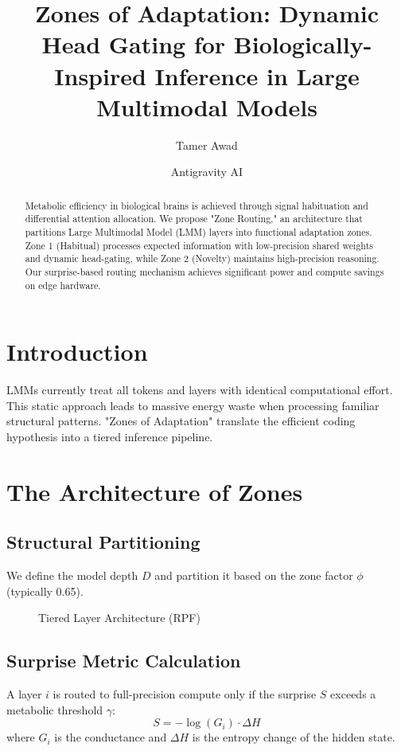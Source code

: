 \documentclass[10pt,twocolumn,letterpaper]{article}
\title{Zones of Adaptation: Dynamic Head Gating for Biologically-Inspired Inference in Large Multimodal Models}
\author[1]{Tamer Awad}
\author[2]{Antigravity AI}
\affil[1]{Menofia University, Egypt}
\affil[2]{Advanced Agentic Coding Team}
\date{}
\begin{document}
\maketitle

\begin{abstract}
Metabolic efficiency in biological brains is achieved through signal habituation and differential attention allocation. We propose "Zone Routing," an architecture that partitions Large Multimodal Model (LMM) layers into functional adaptation zones. Zone 1 (Habitual) processes expected information with low-precision shared weights and dynamic head-gating, while Zone 2 (Novelty) maintains high-precision reasoning. Our surprise-based routing mechanism achieves significant power and compute savings on edge hardware.
\end{abstract}

\section{Introduction}
LMMs currently treat all tokens and layers with identical computational effort. This static approach leads to massive energy waste when processing familiar structural patterns. "Zones of Adaptation" translate the efficient coding hypothesis into a tiered inference pipeline.

\section{The Architecture of Zones}
\subsection{Structural Partitioning}
We define the model depth $D$ and partition it based on the zone factor $\phi$ (typically 0.65).

\begin{figure}[h!]
\centering
{}
\caption{Tiered Layer Architecture (RPF)}
\end{figure}

\subsection{Surprise Metric Calculation}
A layer $i$ is routed to full-precision compute only if the surprise $S$ exceeds a metabolic threshold $\gamma$:
\begin{equation}
S = -\log(G_i) \cdot \Delta H
\end{equation}
where $G_i$ is the conductance and $\Delta H$ is the entropy change of the hidden state.
\end{document}
